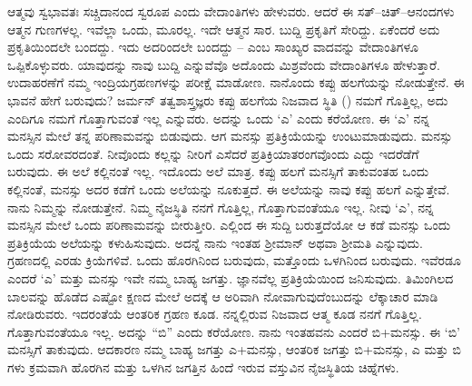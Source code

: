 ಆತ್ಮವು ಸ್ವಭಾವತಃ ಸಚ್ಚಿದಾನಂದ ಸ್ವರೂಪ ಎಂದು ವೇದಾಂತಿಗಳು ಹೇಳುವರು. ಆದರೆ ಈ ಸತ್–ಚಿತ್–ಆನಂದಗಳು ಆತ್ಮನ ಗುಣಗಳಲ್ಲ. ಇವೆಲ್ಲಾ ಒಂದು, ಮೂರಲ್ಲ. ಇದೇ ಆತ್ಮನ ಸಾರ. ಬುದ್ದಿ ಪ್ರಕೃತಿಗೆ ಸೇರಿದ್ದು. ಏಕೆಂದರೆ ಅದು ಪ್ರಕೃತಿಯಿಂದಲೇ ಬಂದದ್ದು. ಇದು ಅದರಿಂದಲೇ ಬಂದದ್ದು – ಎಂಬ ಸಾಂಖ್ಯರ ವಾದವನ್ನು ವೇದಾಂತಿಗಳೂ ಒಪ್ಪಿಕೊಳ್ಳುವರು. ಯಾವುದನ್ನು ನಾವು ಬುದ್ದಿ ಎನ್ನುವೆವೊ ಅದೊಂದು ಮಿಶ್ರವೆಂದು ವೇದಾಂತಿಗಳೂ ಹೇಳುತ್ತಾರೆ. ಉದಾಹರಣೆಗೆ ನಮ್ಮ ಇಂದ್ರಿಯಗ್ರಹಣಗಳನ್ನು ಪರೀಕ್ಷೆ ಮಾಡೋಣ. ನಾನೊಂದು ಕಪ್ಪು ಹಲಗೆಯನ್ನು ನೋಡುತ್ತೇನೆ. ಈ ಭಾವನೆ ಹೇಗೆ ಬರುವುದು? ಜರ್ಮನ್ ತತ್ವಶಾಸ್ತ್ರಜ್ಞರು ಕಪ್ಪು ಹಲಗೆಯ ನಿಜವಾದ ಸ್ಥಿತಿ () ನಮಗೆ ಗೊತ್ತಿಲ್ಲ, ಅದು ಎಂದಿಗೂ ನಮಗೆ ಗೊತ್ತಾಗುವಂತೆ ಇಲ್ಲ ಎನ್ನುವರು. ಅದನ್ನು ಒಂದು `ಎ' ಎಂದು ಕರೆಯೋಣ. ಈ `ಎ' ನನ್ನ ಮನಸ್ಸಿನ ಮೇಲೆ ತನ್ನ ಪರಿಣಾಮವನ್ನು ಬಿಡುವುದು. ಆಗ ಮನಸ್ಸು ಪ್ರತಿಕ್ರಿಯೆಯನ್ನು ಉಂಟುಮಾಡುವುದು. ಮನಸ್ಸು ಒಂದು ಸರೋವರದಂತೆ. ನೀವೊಂದು ಕಲ್ಲನ್ನು ನೀರಿಗೆ ಎಸೆದರೆ ಪ್ರತಿಕ್ರಿಯಾತರಂಗವೊಂದು ಎದ್ದು ಇದರೆಡೆಗೆ ಬರುವುದು. ಈ ಅಲೆ ಕಲ್ಲಿನಂತೆ ಇಲ್ಲ. ಇದೊಂದು ಅಲೆ ಮಾತ್ರ. ಕಪ್ಪು ಹಲಗೆ ಮನಸ್ಸಿಗೆ ತಾಕುವಂತಹ ಒಂದು ಕಲ್ಲಿನಂತೆ, ಮನಸ್ಸು ಅದರ ಕಡೆಗೆ ಒಂದು ಅಲೆಯನ್ನು ನೂಕುತ್ತದೆ. ಈ ಅಲೆಯನ್ನು ನಾವು ಕಪ್ಪು ಹಲಗೆ ಎನ್ನುತ್ತೇವೆ. ನಾನು ನಿಮ್ಮನ್ನು ನೋಡುತ್ತೇನೆ. ನಿಮ್ಮ ನೈಜಸ್ಥಿತಿ ನನಗೆ ಗೊತ್ತಿಲ್ಲ, ಗೊತ್ತಾಗುವಂತೆಯೂ ಇಲ್ಲ. ನೀವು `ಎ', ನನ್ನ ಮನಸ್ಸಿನ ಮೇಲೆ ಒಂದು ಪರಿಣಾಮವನ್ನು ಬೀರುತ್ತೀರಿ. ಎಲ್ಲಿಂದ ಈ ಸುದ್ದಿ ಬರುತ್ತದೆಯೋ ಆ ಕಡೆ ಮನಸ್ಸು ಒಂದು ಪ್ರತಿಕ್ರಿಯೆಯ ಅಲೆಯನ್ನು ಕಳುಹಿಸುವುದು. ಅದನ್ನೆ ನಾನು ಇಂತಹ ಶ‍್ರೀಮಾನ್ ಅಥವಾ ಶ‍್ರೀಮತಿ ಎನ್ನುವುದು. ಗ್ರಹಣದಲ್ಲಿ ಎರಡು ಕ್ರಿಯೆಗಳಿವೆ. ಒಂದು ಹೊರಗಿನಿಂದ ಬರುವುದು, ಮತ್ತೊಂದು ಒಳಗಿನಿಂದ ಬರುವುದು. ಇವೆರಡೂ ಎಂದರೆ `ಎ' ಮತ್ತು ಮನಸ್ಸು ಇವೇ ನಮ್ಮ ಬಾಹ್ಯ ಜಗತ್ತು. ಜ್ಞಾನವೆಲ್ಲ ಪ್ರತಿಕ್ರಿಯೆಯಿಂದ ಜನಿಸುವುದು. ತಿಮಿಂಗಿಲದ ಬಾಲವನ್ನು ಹೊಡೆದ ಎಷ್ಟೋ ಕ್ಷಣದ ಮೇಲೆ ಅದಕ್ಕೆ ಆ ಅರಿವಾಗಿ ನೋವಾಗುವುದೆಂಬುದನ್ನು ಲೆಕ್ಕಾಚಾರ ಮಾಡಿ ನೋಡಿರುವರು. ಇದರಂತೆಯೆ ಆಂತರಿಕ ಗ್ರಹಣ ಕೂಡ. ನನ್ನಲ್ಲಿರುವ ನಿಜವಾದ ಆತ್ಮ ಕೂಡ ನನಗೆ ಗೊತ್ತಿಲ್ಲ. ಗೊತ್ತಾಗುವಂತೆಯೂ ಇಲ್ಲ. ಅದನ್ನು “ಬಿ” ಎಂದು ಕರೆಯೋಣ. ನಾನು ಇಂತಹವನು ಎಂದರೆ ಬಿ+ಮನಸ್ಸು. ಈ `ಬಿ' ಮನಸ್ಸಿಗೆ ತಾಕುವುದು. ಆದಕಾರಣ ನಮ್ಮ ಬಾಹ್ಯ ಜಗತ್ತು ಎ+ಮನಸ್ಸು, ಆಂತರಿಕ ಜಗತ್ತು ಬಿ+ಮನಸ್ಸು, ಎ ಮತ್ತು ಬಿ ಗಳು ಕ್ರಮವಾಗಿ ಹೊರಗಿನ ಮತ್ತು ಒಳಗಿನ ಜಗತ್ತಿನ ಹಿಂದೆ ಇರುವ ವಸ್ತುವಿನ ನೈಜಸ್ಥಿತಿಯ ಚಿಹ್ನೆಗಳು.

